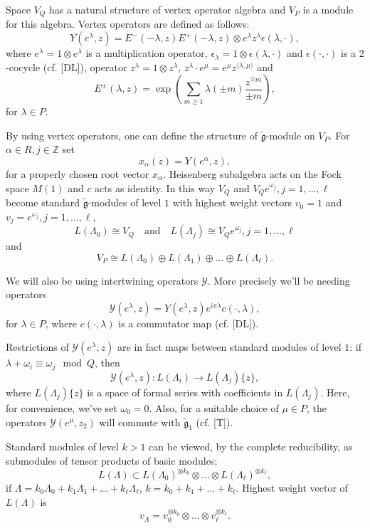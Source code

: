 \documentclass[a4paper, 10pt,oneside]{amsart}
\begin{document}
Space $V_Q$ has a natural structure of vertex operator algebra and
$V_P$ is a module for this algebra. Vertex operators are defined as
follows:
\begin{equation}Y(e^\lambda,z)=E^-(-\lambda,z)E^+(-\lambda,z)\otimes
e^\lambda z^\lambda \epsilon(\lambda,\cdot),
\label{vop_jed}\end{equation} where $e^\lambda=1\otimes e^\lambda$
is a multiplication operator, $\epsilon_\lambda=1\otimes
\epsilon(\lambda,\cdot)$ and $\epsilon(\cdot,\cdot)$ is a
$2$-cocycle (cf. [DL]), operator $z^\lambda=1\otimes z^\lambda$,
$z^\lambda \cdot e^\mu=e^\mu z^{\langle \lambda,\mu \rangle}$ and
$$E^{\pm}(\lambda,z)=\exp \left(\sum_{m\geq 1}\lambda(\pm m) \frac{z^{\mp m}}{\pm m}\right),$$
for $\lambda\in P$.

By using vertex operators, one can define the structure of
${\tilde{{\mathfrak g}}}$-module on $V_P$. For $\alpha\in R,j\in{{\mathbb Z}}$ set
$$x_\alpha(z)=Y(e^\alpha,z),$$
for a properly chosen root vector $x_\alpha$. Heisenberg
subalgebra acts on the Fock space $M(1)$ and $c$ acts as identity.
In this way $V_Q$ and $V_Q e^{\omega_j},j=1,\dots,\ell$ become standard
${\tilde{{\mathfrak g}}}$-modules of level $1$ with highest weight vectors
$v_0=1$ and $v_j=e^{\omega_j},j=1,\dots,\ell$,
$$L(\Lambda_0)\cong V_Q
\quad \textrm{and}\quad L(\Lambda_j)\cong V_Q
e^{\omega_j},j=1,\dots,\ell$$ and
$$V_P\cong L(\Lambda_0)\oplus L(\Lambda_1)\oplus\dots
\oplus L(\Lambda_\ell).$$

We will also be using intertwining operators $\mathcal Y$. More
precisely we'll be needing operators
$${\mathcal Y} (e^\lambda,z)=Y(e^\lambda,z)e^{i\pi\lambda}c(\cdot,\lambda),$$
for $\lambda\in P$, where $c(\cdot,\lambda)$ is a commutator map
(cf. [DL]).

 Restrictions of ${\mathcal Y} (e^\lambda,z)$ are in fact maps between standard modules of level
 $1$: if $\lambda+\omega_i \equiv
\omega_j \mod Q$, then
\begin{equation} \label{evop_jed} {\mathcal Y} (e^\lambda,z):L(\Lambda_i)\to
L(\Lambda_j)\{z\},\end{equation} where $L(\Lambda_j)\{z\}$ is a
space of formal series with coefficients in $L(\Lambda_j)$. Here, for convenience, we've set $\omega_0=0$. Also,
for a suitable choice of $\mu\in P$, the operators ${\mathcal
Y}(e^\mu,z_2)$ will commute with ${\tilde{{\mathfrak g}}}_1$ (cf. [T]).

Standard modules of level $k>1$ can be viewed, by the complete
reducibility, as submodules of tensor products of basic modules;
$$L(\Lambda)\subset L(\Lambda_0)^{\otimes
k_0}\otimes\dots\otimes L(\Lambda_\ell)^{\otimes k_\ell},$$ if
$\Lambda=k_0 \Lambda_0+k_1 \Lambda_1+\dots+k_\ell \Lambda_\ell$,
$k=k_0+k_1+\dots+k_\ell$. Highest weight vector of $L(\Lambda)$ is
$$v_\Lambda=v_{0}^{\otimes k_0}\otimes\dots\otimes
v_{\ell}^{\otimes k_\ell}.$$
\end{document}
